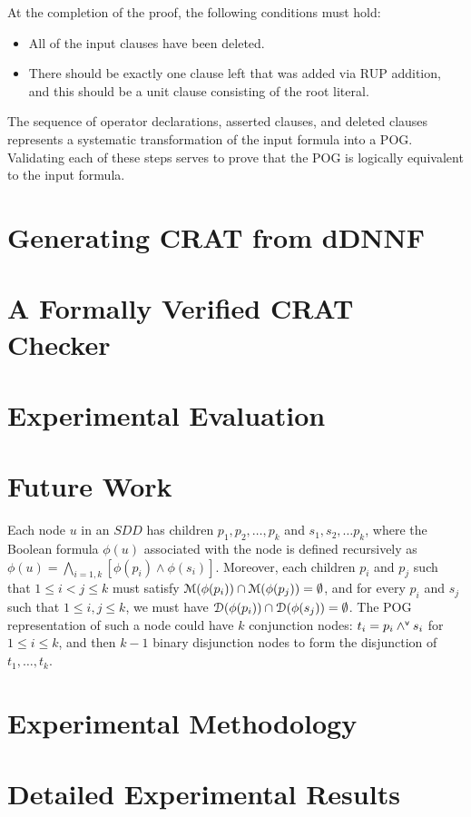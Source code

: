 \documentclass[letterpaper,USenglish,cleveref, autoref, thm-restate]{lipics-v2021}
\newcommand{\pand}{\mathbin{\land^{\sf v}}}
\newcommand{\dependencyset}{{\cal D}}
\newcommand{\modelset}{{\cal M}}
\begin{document}
At the completion of the proof, the following conditions must hold:
\begin{itemize}
\item All of the input clauses have been deleted.
\item There should be exactly one clause left that was added via RUP
  addition, and this should be a unit clause consisting of the root literal.
\end{itemize}

The sequence of operator declarations, asserted clauses, and deleted
clauses represents a systematic transformation of the input formula
into a POG\@.  Validating each of these steps serves to prove that the
POG is logically equivalent to the input formula.

\section{Generating CRAT from dDNNF}

\section{A Formally Verified CRAT Checker}

\section{Experimental Evaluation}

\section{Future Work}
\label{sect:future}


Each node $u$ in an $SDD$ has children $p_1, p_2, \ldots, p_k$ and
$s_1, s_2, \ldots p_k$, where the Boolean formula $\phi(u)$ associated
with the node is defined recursively as $\phi(u) = \bigwedge_{i=1,k}
[\phi(p_i) \land \phi(s_i)]$.  Moreover, each children $p_i$ and $p_j$
such that $1 \leq i < j \leq k$ must satisfy $\modelset(\phi(p_i))
\cap \modelset(\phi(p_j)) = \emptyset$, and for every $p_i$ and $s_j$
such that $1 \leq i,j \leq k$, we must have $\dependencyset(\phi(p_i))
\cap \dependencyset(\phi(s_j)) = \emptyset$.  The POG representation
of such a node could have $k$ conjunction nodes: $t_i = p_i \pand s_i$
for $1 \leq i \leq k$, and then $k-1$ binary disjunction nodes to form
the disjunction of $t_1, \ldots, t_k$.




\appendix

\section{Experimental Methodology}

\section{Detailed Experimental Results}
\end{document}
